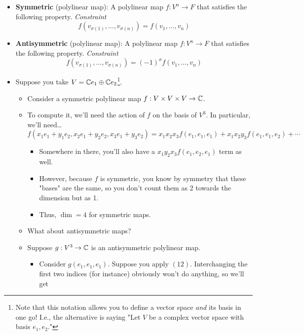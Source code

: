 \documentclass[../notes.tex]{subfiles}
\begin{document}
\begin{itemize}
\begin{itemize}
    \end{itemize}
    \item \textbf{Symmetric} (polylinear map): A polylinear map $f:V^n\to F$ that satisfies the following property. \emph{Constraint}
    \begin{equation*}
        f(v_{\sigma(1)},\dots,v_{\sigma(n)}) = f(v_1,\dots,v_n)
    \end{equation*}
    \item \textbf{Antisymmetric} (polylinear map): A polylinear map $f:V^n\to F$ that satisfies the following property. \emph{Constraint}
    \begin{equation*}
        f(v_{\sigma(1)},\dots,v_{\sigma(n)}) = (-1)^\sigma f(v_1,\dots,v_n)
    \end{equation*}
    \item Suppose you take $V=\mathbb{C} e_1\oplus\mathbb{C} e_2$\footnote{Note that this notation allows you to define a vector space \emph{and} its basis in one go! I.e., the alternative is saying "Let $V$ be a complex vector space with basis $e_1,e_2$."}.
    \begin{itemize}
        \item Consider a symmetric polylinear map $f:V\times V\times V\to\mathbb{C}$.
        \item To compute it, we'll need the action of $f$ on the basis of $V^3$. In particular, we'll need\dots
        \begin{equation*}
            f(x_1e_1+y_1e_2,x_2e_1+y_2e_2,x_3e_1+y_3e_2) = x_1x_2x_3f(e_1,e_1,e_1)+x_1x_2y_3f(e_1,e_1,e_2)+\cdots
        \end{equation*}
        \begin{itemize}
            \item Somewhere in there, you'll also have a $x_1y_2x_3f(e_1,e_2,e_1)$ term as well.
            \item However, because $f$ is symmetric, you know by symmetry that these "bases" are the same, so you don't count them as 2 towards the dimension but as 1.
            \item Thus, $\dim=4$ for symmetric maps.
        \end{itemize}
        \item What about antisymmetric maps?
        \item Suppose $g:V^3\to\mathbb{C}$ is an antisymmetric polylinear map.
        \begin{itemize}
            \item Consider $g(e_1,e_1,e_1)$. Suppose you apply $(12)$. Interchanging the first two indices (for instance) obviously won't do anything, so we'll get

\end{itemize}
\end{itemize}
\end{itemize}
\end{document}
